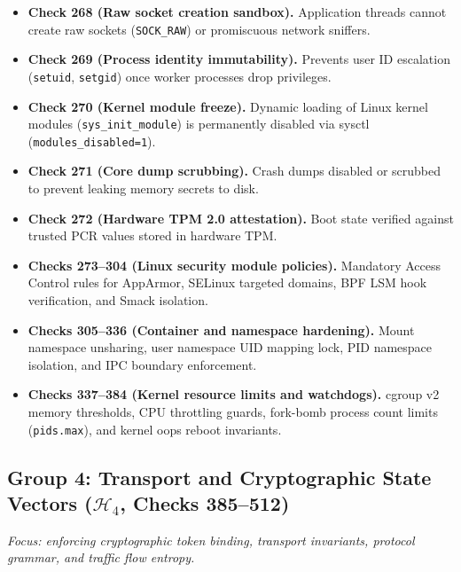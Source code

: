 \documentclass{portalciencia}
\theoremstyle{plain}
\theoremstyle{definition}
\begin{document}
\begin{itemize}
  \item \textbf{Check 268 (Raw socket creation sandbox).} Application threads cannot create raw sockets (\texttt{SOCK\_RAW}) or promiscuous network sniffers.
  \item \textbf{Check 269 (Process identity immutability).} Prevents user ID escalation (\texttt{setuid}, \texttt{setgid}) once worker processes drop privileges.
  \item \textbf{Check 270 (Kernel module freeze).} Dynamic loading of Linux kernel modules (\texttt{sys\_init\_module}) is permanently disabled via sysctl (\texttt{modules\_disabled=1}).
  \item \textbf{Check 271 (Core dump scrubbing).} Crash dumps disabled or scrubbed to prevent leaking memory secrets to disk.
  \item \textbf{Check 272 (Hardware TPM 2.0 attestation).} Boot state verified against trusted PCR values stored in hardware TPM.
  \item \textbf{Checks 273--304 (Linux security module policies).} Mandatory Access Control rules for AppArmor, SELinux targeted domains, BPF LSM hook verification, and Smack isolation.
  \item \textbf{Checks 305--336 (Container and namespace hardening).} Mount namespace unsharing, user namespace UID mapping lock, PID namespace isolation, and IPC boundary enforcement.
  \item \textbf{Checks 337--384 (Kernel resource limits and watchdogs).} cgroup v2 memory thresholds, CPU throttling guards, fork-bomb process count limits (\texttt{pids.max}), and kernel oops reboot invariants.
\end{itemize}

\subsection{Group 4: Transport and Cryptographic State Vectors ($\mathcal{H}_4$, Checks 385--512)}

\emph{Focus: enforcing cryptographic token binding, transport invariants, protocol grammar, and traffic flow entropy.}
\end{document}
